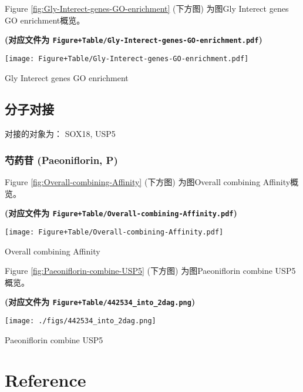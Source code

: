 \documentclass[
]{article}
\begin{document}
Figure \ref{fig:Gly-Interect-genes-GO-enrichment} (下方图) 为图Gly Interect genes GO enrichment概览。

\textbf{(对应文件为 \texttt{Figure+Table/Gly-Interect-genes-GO-enrichment.pdf})}

\def\@captype{figure}
\begin{center}
\texttt{[image: Figure+Table/Gly-Interect-genes-GO-enrichment.pdf]}
\caption{Gly Interect genes GO enrichment}\label{fig:Gly-Interect-genes-GO-enrichment}
\end{center}

\hypertarget{ux5206ux5b50ux5bf9ux63a5}{%
\subsection{分子对接}\label{ux5206ux5b50ux5bf9ux63a5}}

对接的对象为： SOX18, USP5

\hypertarget{ux828dux836fux82f7-paeoniflorin-p}{%
\subsubsection{芍药苷 (Paeoniflorin, P)}\label{ux828dux836fux82f7-paeoniflorin-p}}

Figure \ref{fig:Overall-combining-Affinity} (下方图) 为图Overall combining Affinity概览。

\textbf{(对应文件为 \texttt{Figure+Table/Overall-combining-Affinity.pdf})}

\def\@captype{figure}
\begin{center}
\texttt{[image: Figure+Table/Overall-combining-Affinity.pdf]}
\caption{Overall combining Affinity}\label{fig:Overall-combining-Affinity}
\end{center}

Figure \ref{fig:Paeoniflorin-combine-USP5} (下方图) 为图Paeoniflorin combine USP5概览。

\textbf{(对应文件为 \texttt{Figure+Table/442534\_into\_2dag.png})}

\def\@captype{figure}
\begin{center}
\texttt{[image: ./figs/442534\_into\_2dag.png]}
\caption{Paeoniflorin combine USP5}\label{fig:Paeoniflorin-combine-USP5}
\end{center}

\hypertarget{bibliography}{%
\section*{Reference}\label{bibliography}}
\end{document}

